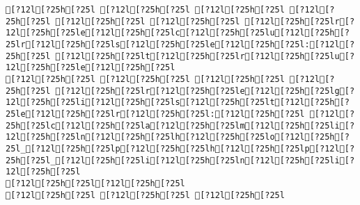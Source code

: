 \documentclass{scrartcl}
\begin{document}
\begin{Verbatim}
[?12l[?25h[?25l [?12l[?25h[?25l [?12l[?25h[?25l [?12l[?25h[?25l [?12l[?25h[?25l [?12l[?25h[?25l [?12l[?25h[?25lr[?12l[?25h[?25le[?12l[?25h[?25lc[?12l[?25h[?25lu[?12l[?25h[?25lr[?12l[?25h[?25ls[?12l[?25h[?25le[?12l[?25h[?25l:[?12l[?25h[?25l [?12l[?25h[?25lt[?12l[?25h[?25lr[?12l[?25h[?25lu[?12l[?25h[?25le[?12l[?25h[?25l
[?12l[?25h[?25l [?12l[?25h[?25l [?12l[?25h[?25l [?12l[?25h[?25l [?12l[?25h[?25lr[?12l[?25h[?25le[?12l[?25h[?25lg[?12l[?25h[?25li[?12l[?25h[?25ls[?12l[?25h[?25lt[?12l[?25h[?25le[?12l[?25h[?25lr[?12l[?25h[?25l:[?12l[?25h[?25l [?12l[?25h[?25lc[?12l[?25h[?25la[?12l[?25h[?25lm[?12l[?25h[?25li[?12l[?25h[?25ln[?12l[?25h[?25lh[?12l[?25h[?25lo[?12l[?25h[?25l_[?12l[?25h[?25lp[?12l[?25h[?25lh[?12l[?25h[?25lp[?12l[?25h[?25l_[?12l[?25h[?25li[?12l[?25h[?25ln[?12l[?25h[?25li[?12l[?25h[?25l
[?12l[?25h[?25l[?12l[?25h[?25l
[?12l[?25h[?25l [?12l[?25h[?25l [?12l[?25h[?25l

\end{Verbatim}
\end{document}
